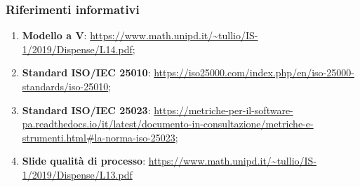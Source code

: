 		\subsubsection{Riferimenti informativi}
		\begin{enumerate}
		    \item \textbf{Modello a V}: \url{https://www.math.unipd.it/~tullio/IS-1/2019/Dispense/L14.pdf};
		    \item \textbf{Standard ISO/IEC 25010}: \url{https://iso25000.com/index.php/en/iso-25000-standards/iso-25010};
   		    \item \textbf{Standard ISO/IEC 25023}: \url{https://metriche-per-il-software-pa.readthedocs.io/it/latest/documento-in-consultazione/metriche-e-strumenti.html#la-norma-iso-25023};
   		    \item \textbf{Slide qualità di processo}: \url{https://www.math.unipd.it/~tullio/IS-1/2019/Dispense/L13.pdf}
		\end{enumerate}
	
	
	

	
	
	
	
